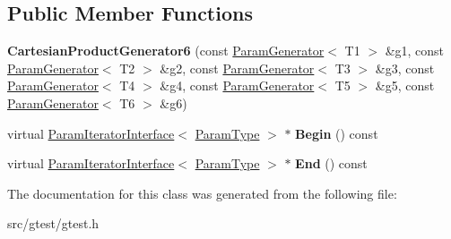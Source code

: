 \subsection*{Public Member Functions}
\begin{DoxyCompactItemize}
\item 
\mbox{\label{classtesting_1_1internal_1_1_cartesian_product_generator6_a6ff15d46e4ff7f8f24215b8244a6a094}} 
{\bfseries Cartesian\+Product\+Generator6} (const \mbox{\hyperlink{classtesting_1_1internal_1_1_param_generator}{Param\+Generator}}$<$ T1 $>$ \&g1, const \mbox{\hyperlink{classtesting_1_1internal_1_1_param_generator}{Param\+Generator}}$<$ T2 $>$ \&g2, const \mbox{\hyperlink{classtesting_1_1internal_1_1_param_generator}{Param\+Generator}}$<$ T3 $>$ \&g3, const \mbox{\hyperlink{classtesting_1_1internal_1_1_param_generator}{Param\+Generator}}$<$ T4 $>$ \&g4, const \mbox{\hyperlink{classtesting_1_1internal_1_1_param_generator}{Param\+Generator}}$<$ T5 $>$ \&g5, const \mbox{\hyperlink{classtesting_1_1internal_1_1_param_generator}{Param\+Generator}}$<$ T6 $>$ \&g6)
\item 
\mbox{\label{classtesting_1_1internal_1_1_cartesian_product_generator6_a698a1b1a1bc3d3832a292f33acd4fb8f}} 
virtual \mbox{\hyperlink{classtesting_1_1internal_1_1_param_iterator_interface}{Param\+Iterator\+Interface}}$<$ \mbox{\hyperlink{classstd_1_1tr1_1_1tuple}{Param\+Type}} $>$ $\ast$ {\bfseries Begin} () const
\item 
\mbox{\label{classtesting_1_1internal_1_1_cartesian_product_generator6_a35431fe1e3b9eb35d8bfc2fcb739c4a7}} 
virtual \mbox{\hyperlink{classtesting_1_1internal_1_1_param_iterator_interface}{Param\+Iterator\+Interface}}$<$ \mbox{\hyperlink{classstd_1_1tr1_1_1tuple}{Param\+Type}} $>$ $\ast$ {\bfseries End} () const
\end{DoxyCompactItemize}


The documentation for this class was generated from the following file\+:\begin{DoxyCompactItemize}
\item 
src/gtest/gtest.\+h\end{DoxyCompactItemize}
